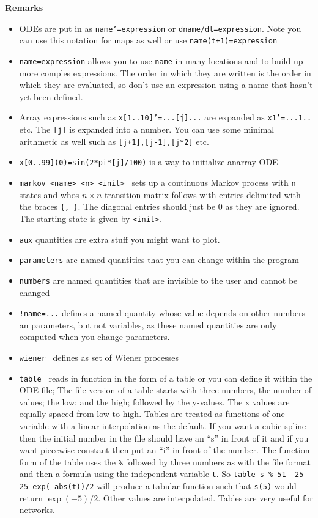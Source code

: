 {\bf Remarks}
\begin{itemize}\itemsep -.05in
\item ODEs are put in as {\tt name'=expression} or {\tt dname/dt=expression}. Note you can use this notation for maps as well or use {\tt name(t+1)=expression}
\item {\tt name=expression} allows you to use {\tt name} in many locations and to build up more comples expressions. The order in which they are written is the order in which they are evaluated, so don't use an expression using a name that hasn't yet been defined.
\item Array expressions such as {\tt x[1..10]'=...[j]...} are expanded as {\tt x1'=...1..} etc. The {\tt [j]} is expanded into a number. You can use some minimal arithmetic as well such as {\tt [j+1],[j-1],[j*2]} etc. 
\item {\tt x[0..99](0)=sin(2*pi*[j]/100)} is a way to initialize anarray ODE    
\item {\tt markov <name> <n> <init> } sets up a continuous Markov process with {\tt n} states and whos $n\times n$ transition matrix follows with entries delimited with the braces {\tt \{, \}}. The diagonal entries should just be 0 as they are ignored. The starting state is given by {\tt <init>}.  
\item {\tt aux} quantities are extra stuff you might want to plot.
\item {\tt parameters} are named quantities that you can change within the program
\item {\tt numbers} are named quantities that are invisible to the user and cannot be changed
\item {\tt !name=...} defines a named quantity whose value depends on other numbers an parameters, but not variables, as these named quantities are only computed when you change parameters.       
\item {\tt wiener } defines as set of Wiener processes 
\item {\tt table } reads in function in the form of a table or you can define it within the ODE file; The file version of a table starts with three numbers, the number of values; the low; and the high; followed by the y-values.  The x values are equally spaced from low to high. Tables are treated as functions of one variable with a linear interpolation as the default. If you want a cubic spline then the initial number in the file should have an ``s'' in front of it and if you want piecewise constant then put an ``i'' in front of the number.  The function form of the table uses the {\tt \%} followed by three numbers as with the file format and then a formula using the independent variable {\tt t}. So {\tt table s \% 51 -25 25 exp(-abs(t))/2} will produce a tabular function such that {\tt s(5)} would return $\exp(-5)/2.$  Other values are interpolated. Tables are very useful for networks. 

\end{itemize}
